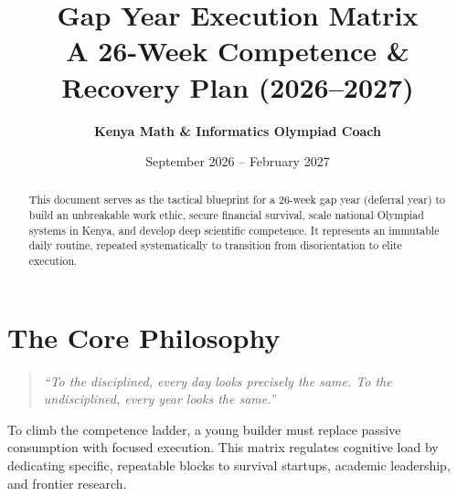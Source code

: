 \documentclass[11pt,a4paper]{article}
\title{\textbf{Gap Year Execution Matrix \\ \large A 26-Week Competence \& Recovery Plan (2026--2027)}}
\author{\textbf{Kenya Math \& Informatics Olympiad Coach}}
\date{September 2026 -- February 2027}
\begin{document}
\maketitle

\begin{abstract}
\noindent This document serves as the tactical blueprint for a 26-week gap year (deferral year) to build an unbreakable work ethic, secure financial survival, scale national Olympiad systems in Kenya, and develop deep scientific competence. It represents an immutable daily routine, repeated systematically to transition from disorientation to elite execution.
\end{abstract}

\tableofcontents
\newpage

\section{The Core Philosophy}
\begin{quote}
\textit{``To the disciplined, every day looks precisely the same. To the undisciplined, every year looks the same.''}
\end{quote}
To climb the competence ladder, a young builder must replace passive consumption with focused execution. This matrix regulates cognitive load by dedicating specific, repeatable blocks to survival startups, academic leadership, and frontier research.
\end{document}
